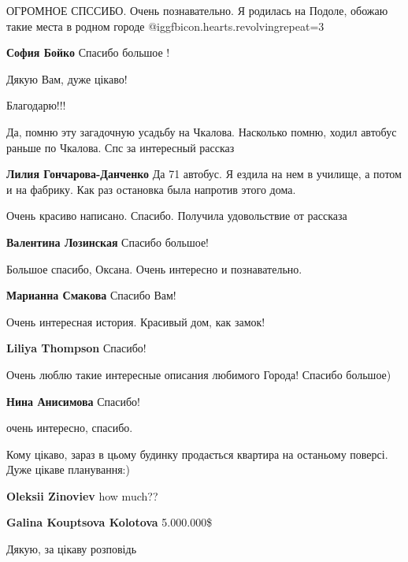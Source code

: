 \begin{itemize}
\begin{itemize}
\end{itemize} %


ОГРОМНОЕ СПССИБО. Очень познавательно. Я родилась на Подоле, обожаю такие места
в родном городе @igg{fbicon.hearts.revolving}{repeat=3} 

\textbf{София Бойко} Спасибо большое !

Дякую Вам, дуже цікаво!

Благодарю!!!

Да, помню эту загадочную усадьбу на Чкалова. Насколько помню, ходил автобус
раньше по Чкалова. Спс за интересный рассказ

\textbf{Лилия Гончарова-Данченко} Да 71 автобус. Я ездила на нем в училище, а потом и на фабрику. Как раз остановка была напротив этого дома.

Очень красиво написано. Спасибо.
Получила удовольствие от рассказа

\textbf{Валентина Лозинская} Спасибо большое!

Большое спасибо, Оксана. Очень интересно и познавательно.

\textbf{Марианна Смакова} Спасибо Вам!

Очень интересная история. Красивый дом, как замок!

\textbf{Liliya Thompson} Спасибо!

Очень люблю такие интересные описания любимого Города! Спасибо большое)

\textbf{Нина Анисимова} Спасибо!

очень интересно, спасибо.

Кому цікаво, зараз в цьому будинку продається квартира на останьому поверсі. Дуже цікаве планування:)

\begin{itemize} %
\textbf{Oleksii Zinoviev} how much??

\textbf{Galina Kouptsova Kolotova} 5.000.000\$
\end{itemize} %

Дякую, за цікаву розповідь


\end{itemize}
